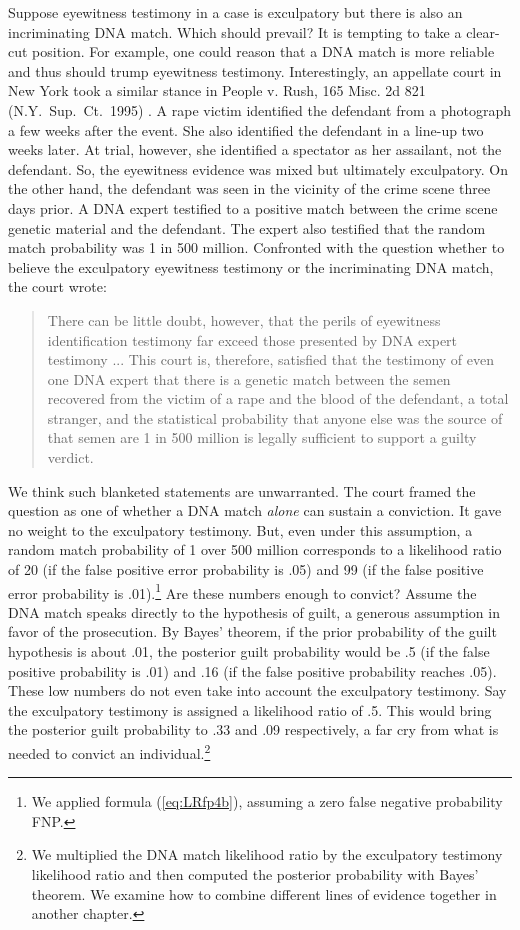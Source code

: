 \documentclass[
  10pt,
  dvipsnames,enabledeprecatedfontcommands]{scrartcl}
\newcommand{\raf}[1]{\todo[color=olive!40]{#1}}
\begin{document}
Suppose eyewitness testimony in a case is exculpatory but there is also
an incriminating DNA match. Which should prevail? It is tempting to take
a clear-cut position. For example, one could reason that a DNA match is
more reliable and thus should trump eyewitness testimony. Interestingly,
an appellate court in New York took a similar stance in People v. Rush,
165 Misc. 2d 821 (N.Y.~Sup.~Ct.~1995) . A rape victim identified the
defendant from a photograph a few weeks after the event. She also
identified the defendant in a line-up two weeks later. At trial,
however, she identified a spectator as her assailant, not the defendant.
So, the eyewitness evidence was mixed but ultimately exculpatory. On the
other hand, the defendant was seen in the vicinity of the crime scene
three days prior. A DNA expert testified to a positive match between the
crime scene genetic material and the defendant. The expert also
testified that the random match probability was 1 in 500 million.
Confronted with the question whether to believe the exculpatory
eyewitness testimony or the incriminating DNA match, the court wrote:

\begin{quote}
There can be little doubt, however, that the perils of eyewitness identification testimony far exceed those presented by DNA expert testimony ... This court is, therefore, satisfied that the testimony of even one DNA expert that there is a genetic match between the semen recovered from the victim of a rape and the blood of the defendant, a total stranger, and the statistical probability that anyone else was the source of that semen are 1 in 500 million is legally sufficient to support a guilty verdict.
\end{quote}

\noindent

We think such blanketed statements are unwarranted. The court framed the
question as one of whether a DNA match \textit{alone} can sustain a
conviction. It gave no weight to the exculpatory testimony. But, even
under this assumption, a random match probability of 1 over 500 million
corresponds to a likelihood ratio of 20 (if the false positive error
probability is .05) and 99 (if the false positive error probability is
.01).\footnote{We applied formula (\ref{eq:LRfp4b}), assuming a zero
  false negative probability FNP.} Are these numbers enough to convict?
Assume the DNA match speaks directly to the hypothesis of guilt, a
generous assumption in favor of the prosecution. By Bayes' theorem, if
the prior probability of the guilt hypothesis is about .01, the
posterior guilt probability would be .5 (if the false positive
probability is .01) and .16 (if the false positive probability reaches
.05). These low numbers do not even take into account the exculpatory
testimony. Say the exculpatory testimony is assigned a likelihood ratio
of .5. This would bring the posterior guilt probability to .33 and .09
respectively, a far cry from what is needed to convict an
individual.\footnote{We multiplied the DNA match likelihood ratio by the
  exculpatory testimony likelihood ratio and then computed the posterior
  probability with Bayes' theorem. We examine how to combine different
  lines of evidence together in another chapter.}
 \raf{M: Check calculations}
\end{document}
